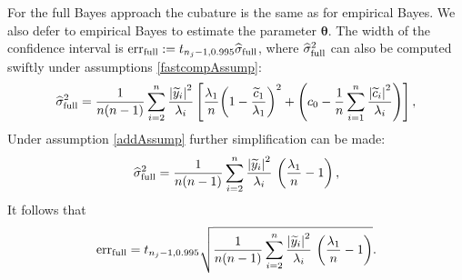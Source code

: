 \documentclass{iitthesis}          %
\newcommand{\bm}[1]{\boldsymbol{#1}}
\newcommand{\vtheta}{{\bm{\theta}}}
\newcommand{\hsigma}{\widehat{\sigma}}
\newcommand{\err}{\textup{err}}
\def\abs#1{\ensuremath{\left \lvert #1 \right \rvert}}
\begin{document}
For the full Bayes approach the cubature is the same as for empirical Bayes.  We also defer to empirical Bayes to estimate the parameter $\vtheta$.  The width of the confidence interval is $\err_{\textup{full}} 
:= t_{n_j-1,0.995} \hsigma_{\textup{full}}$, where $\hsigma_{\textup{full}}^2$ can also be computed swiftly under assumptions \eqref{fastcompAssump}:
\begin{align*} %
\widehat{\sigma}^2_{\textup{full}} =
\frac{1}{n(n-1)} \sum_{i=2}^n \frac{\abs{\widetilde{y}_i}^2}{\lambda_i}
\left[\frac{\lambda_1}{n}{\left(1 - \frac{\widetilde{c}_1}{\lambda_1}\right)^2} + \left(c_0  - \frac 1n \sum_{i=1}^n \frac{\abs{\widetilde{c}_i}^2}{\lambda_i}\right) \right],
\end{align*}
Under assumption \eqref{addAssump} further simplification can be made:
\begin{equation*} %
\widehat{\sigma}^2_{\textup{full}}
=
\frac{1}{n(n-1)} \sum_{i=2}^n \frac{\abs{\widetilde{y}_i}^2}{\lambda_i} \, \left(\frac{\lambda_1}{n}  - 1  \right),
\end{equation*}
It follows that
\begin{equation} \label{FJH:eq:errFullSimple}
\err_{\textup{full}}
=
t_{n_j-1,0.995}
\sqrt{\frac{1}{n(n-1)} \sum_{i=2}^n \frac{\abs{\widetilde{y}_i}^2}{\lambda_i} \, \left(\frac{\lambda_1}{n}  - 1  \right)}.
\end{equation}


\end{document}
